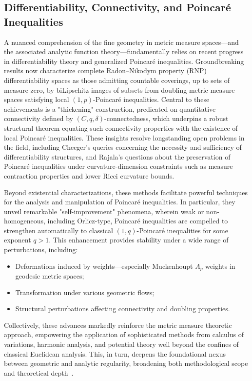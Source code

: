 \subsection{Differentiability, Connectivity, and Poincaré Inequalities}

A nuanced comprehension of the fine geometry in metric measure spaces—and the associated analytic function theory—fundamentally relies on recent progress in differentiability theory and generalized Poincaré inequalities. Groundbreaking results now characterize complete Radon–Nikodym property (RNP) differentiability spaces as those admitting countable coverings, up to sets of measure zero, by biLipschitz images of subsets from doubling metric measure spaces satisfying local $(1,p)$-Poincaré inequalities. Central to these achievements is a "thickening" construction, predicated on quantitative connectivity defined by $(C, q, \delta)$-connectedness, which underpins a robust structural theorem equating such connectivity properties with the existence of local Poincaré inequalities. These insights resolve longstanding open problems in the field, including Cheeger's queries concerning the necessity and sufficiency of differentiability structures, and Rajala's questions about the preservation of Poincaré inequalities under curvature-dimension constraints such as measure contraction properties and lower Ricci curvature bounds.

Beyond existential characterizations, these methods facilitate powerful techniques for the analysis and manipulation of Poincaré inequalities. In particular, they unveil remarkable "self-improvement" phenomena, wherein weak or non-homogeneous, including Orlicz-type, Poincaré inequalities are compelled to strengthen automatically to classical $(1, q)$-Poincaré inequalities for some exponent $q > 1$. This enhancement provides stability under a wide range of perturbations, including:

\begin{itemize}
    \item Deformations induced by weights—especially Muckenhoupt $A_p$ weights in geodesic metric spaces;
    \item Transformation under various geometric flows;
    \item Structural perturbations affecting connectivity and doubling properties.
\end{itemize}

Collectively, these advances markedly reinforce the metric measure theoretic approach, empowering the application of sophisticated methods from calculus of variations, harmonic analysis, and potential theory well beyond the confines of classical Euclidean analysis. This, in turn, deepens the foundational nexus between geometric and analytic regularity, broadening both methodological scope and theoretical depth~\cite{ref93}.

